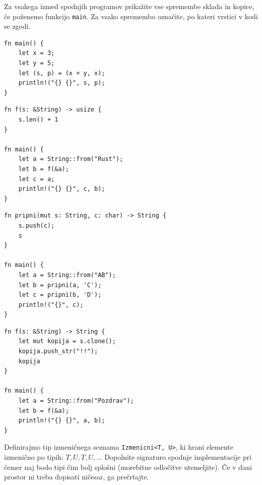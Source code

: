 \documentclass[11pt]{../izpit}
\begin{document}


\naloga[\tocke{10}]
Za vsakega izmed spodnjih programov prikažite vse spremembe sklada in kopice, če poženemo funkcijo \texttt{main}. Za vsako spremembo označite, po kateri vrstici v kodi se zgodi.

\podnaloga
\begin{verbatim}
fn main() {
    let x = 3;
    let y = 5;
    let (s, p) = (x + y, x);
    println!("{} {}", s, p);
}
\end{verbatim}

\podnaloga
\begin{verbatim}
fn f(s: &String) -> usize {
    s.len() + 1
}

fn main() {
    let a = String::from("Rust");
    let b = f(&a);
    let c = a;
    println!("{} {}", c, b);
}
\end{verbatim}

\podnaloga
\begin{verbatim}
fn pripni(mut s: String, c: char) -> String {
    s.push(c);
    s
}

fn main() {
    let a = String::from("AB");
    let b = pripni(a, 'C');
    let c = pripni(b, 'D');
    println!("{}", c);
}
\end{verbatim}
\podnaloga
\begin{verbatim}
fn f(s: &String) -> String {
    let mut kopija = s.clone();
    kopija.push_str("!!");
    kopija
}

fn main() {
    let a = String::from("Pozdrav");
    let b = f(&a);
    println!("{} {}", a, b);
}
\end{verbatim}



\naloga[\tocke{20}]

Definirajmo tip izmeničnega seznama \texttt{Izmenicni<T, U>}, ki hrani elemente izmenično po tipih: $T, U, T, U, \ldots$ Dopolnite signaturo spodnje implementacije pri čemer naj bodo tipi čim bolj splošni (morebitne odločitve utemeljite). Če v dani prostor ni treba dopisati ničesar, ga prečrtajte.
\end{document}
